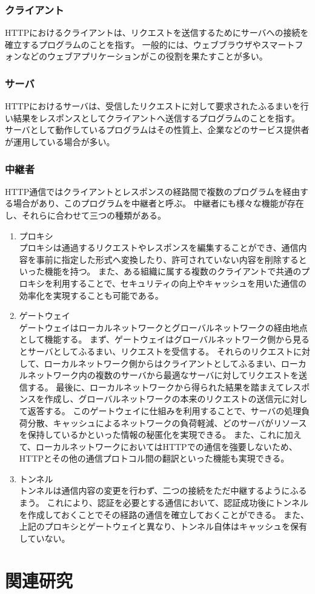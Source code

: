 \documentclass[12pt,a4paper]{jbook}
\begin{document}
\subsubsection{クライアント}
HTTPにおけるクライアントは、リクエストを送信するためにサーバへの接続を確立するプログラムのことを指す。
一般的には、ウェブブラウザやスマートフォンなどのウェブアプリケーションがこの役割を果たすことが多い。

\subsubsection{サーバ}
HTTPにおけるサーバは、受信したリクエストに対して要求されたふるまいを行い結果をレスポンスとしてクライアントへ送信するプログラムのことを指す。
サーバとして動作しているプログラムはその性質上、企業などのサービス提供者が運用している場合が多い。

\subsubsection{中継者}
\label{sec:intermediary}
HTTP通信ではクライアントとレスポンスの経路間で複数のプログラムを経由する場合があり、このプログラムを中継者と呼ぶ。
中継者にも様々な機能が存在し、それらに合わせて三つの種類がある。
\begin{enumerate}
\item プロキシ\\
プロキシは通過するリクエストやレスポンスを編集することができ、通信内容を事前に指定した形式へ変換したり、許可されていない内容を削除するといった機能を持つ。
また、ある組織に属する複数のクライアントで共通のプロキシを利用することで、セキュリティの向上やキャッシュを用いた通信の効率化を実現することも可能である。
\item ゲートウェイ\\
ゲートウェイはローカルネットワークとグローバルネットワークの経由地点として機能する。
まず、ゲートウェイはグローバルネットワーク側から見るとサーバとしてふるまい、リクエストを受信する。
それらのリクエストに対して、ローカルネットワーク側からはクライアントとしてふるまい、ローカルネットワーク内の複数のサーバから最適なサーバに対してリクエストを送信する。
最後に、ローカルネットワークから得られた結果を踏まえてレスポンスを作成し、グローバルネットワークの本来のリクエストの送信元に対して返答する。
このゲートウェイに仕組みを利用することで、サーバの処理負荷分散、キャッシュによるネットワークの負荷軽減、どのサーバがリソースを保持しているかといった情報の秘匿化を実現できる。
また、これに加えて、ローカルネットワークにおいてはHTTPでの通信を強要しないため、HTTPとその他の通信プロトコル間の翻訳といった機能も実現できる。
\item トンネル\\
トンネルは通信内容の変更を行わず、二つの接続をただ中継するようにふるまう。
これにより、認証を必要とする通信において、認証成功後にトンネルを作成しておくことでその経路の通信を確立しておくことができる。
また、上記のプロキシとゲートウェイと異なり、トンネル自体はキャッシュを保有していない。
\end{enumerate}

\section{関連研究}
\end{document}
